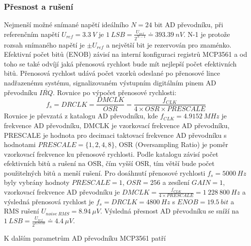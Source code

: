 \subsubsection{Přesnost a rušení}
Nejmenší možné snímané napětí ideálního $N = 24$ bit AD převodníku, při referenčním napětí $U_{ref} = 3.3 \ V $ je $ 1 \ LSB = \frac{U_{ref}}{2^{N-1}} \doteq 393.39 \ nV$. N-1 je protože rozsah snímaného napětí je $\pm U_{ref}$ a největší bit je rezervován pro znaménko.
Efektivní počet bitů (ENOB) závisí na interní konfiguraci registrů MCP3561 a od toho se také odvíjí jaká přenosová rychlost bude mít nejlepší počet efektivních bitů. Přenosová rychlost udává počet vzorků odeslané po přenosové lince nadřazenému systému, signalizovaném výstupním digitálním pinem AD převodníku $\overline{IRQ}$.
Rovnice po výpočet přenosové rychlosti:
\begin{equation}
    f_s = DRCLK = \frac{DMCLK}{OSR} =\frac{f_{CLK}}{4 \times OSR \times PRESCALE}
\end{equation}
Rovnice je převzatá z katalogu AD převodníku, kde $f_{CLK} = 4.9152 \ MHz$ je frekvence AD převodníku, DMCLK je vzorkovací frekvence AD převodníku, PRESCALE je hodnota pro decimaci taktovací frekvence AD převodníku s hodnotami $PRESCALE = \{1, 2, 4, 8\}$, OSR (Oversampling Ratio) je poměr vzorkovací frekvence ku přenosové rychlosti.
Podle katalogu závisí počet efektivních bitů a rušení na OSR, čím vyšší OSR, tím větší bude počet použitelných bitů a menší rušení. Pro dosáhnutí přenosové rychlosti $f_s = 5000 \ Hz$ byly vybrány hodnoty $PRESCALE = 1$, $OSR = 256$ a zesílení $GAIN = 1$,
vzorkovací frekvence AD převodníku je $DMCLK = \frac{f_{CLK}}{4 \times PRESCALE} = 1 \ 228 \ 800 \ Hz$ a výsledná přenosová rychlost je $f_s = DRCLK = 4800 \ Hz$ s $ENOB = 19.5 \ bit$ a RMS rušení $U_{noise \ RMS} = 8.94 \ \mu V$.
Výsledná přesnost AD převodníku se sníží na $ 1 \ LSB = \frac{U_{ref}}{2^{ENOB}} \doteq  4.4 \ \mu V$.
\par
K dalším parametrům AD převodníku MCP3561 patří
